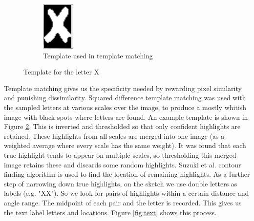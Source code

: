 \documentclass[11pt]{IEEEtran}
\begin{document}
\begin{figure}[h]
\begin{subfigure}[b]{0.15\textwidth}
         \includegraphics[width=\textwidth]{tem3}
         \caption{Template used in template matching}
         \label{fig:tem3}
     \end{subfigure}
     \hfill
        \caption{Template for the letter X}
        \label{fig:tem}
\end{figure}

Template matching gives us the specificity needed by rewarding pixel similarity and punishing dissimilarity. Squared difference template matching was used with the sampled letters at various scales over the image, to produce a mostly whitish image with black spots where letters are found. An example template is shown in Figure \ref{fig:tem}. This is inverted and thresholded so that only confident highlights are retained. These highlights from all scales are merged into one image (as a weighted average where every scale has the same weight). It was found that each true highlight tends to appear on multiple scales, so thresholding this merged image retains these and discards some random highlights. Suzuki et al. \cite{suzuki1985topological} contour finding algorithm is used to find the location of remaining highlights. As a further step of narrowing down true highlights, on the sketch we use double letters as labels (e.g. "XX"). So we look for pairs of highlights within a certain distance and angle range. The midpoint of each pair and the letter is recorded. This gives us the text label letters and locations. Figure \ref{fig:text} shows this process.
\end{document}
